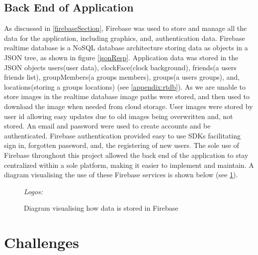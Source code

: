\subsection{Back End of Application}
As discussed in \ref{firebaseSection}, Firebase was used to store and manage all the data for the application, including graphics, and, authentication data. Firebase realtime database is a NoSQL database architecture storing data as objects in a JSON tree, as shown in figure \ref{jsonResp}. Application data was stored in the JSON objects users(user data), clockFace(clock background), friends(a users friends list), groupMembers(a groups members), groups(a users groups), and, locations(storing a groups locations) (see \ref{appendix:rtdb}). As we are unable to store images in the realtime database image paths were stored, and then used to download the image when needed from cloud storage. User images were stored by user id allowing easy updates due to old images being overwritten and, not stored. An email and password were used to create accounts and be authenticated. Firebase authentication provided easy to use SDKs facilitating sign in, forgotten password, and, the registering of new users. The sole use of Firebase throughout this project allowed the back end of the application to stay centralized within a sole platform, making it easier to implement and maintain. A diagram visualising the use of these Firebase services is shown below (see \ref{fig:firebaseDiag}).
\begin{figure}[!htbp]
    \centering
    \begin{subfigure}[b]{\textwidth}
    \end{subfigure}
    \caption{Diagram visualising how data is stored in Firebase} \small\textit{{Logos: \cite{storImg, rtdbImg, authImg}}}
    \label{fig:firebaseDiag}
\end{figure}
\FloatBarrier
\section{Challenges}
